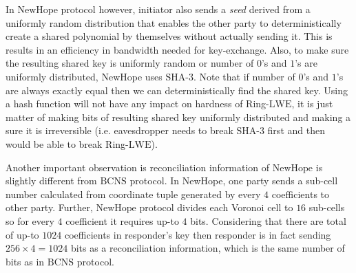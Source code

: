 In $\mathrm{NewHope}$ protocol however, initiator also sends a \textit{seed} derived from a uniformly random distribution that enables the other party to deterministically create a shared polynomial by themselves without actually sending it. This is results in an efficiency in bandwidth needed for key-exchange. Also, to make sure the resulting shared key is uniformly random or number of $0$'s and $1$'s are uniformly distributed, NewHope uses $\mathrm{SHA}$-3. Note that if number of $0$'s and $1$'s are always exactly equal then we can deterministically find the shared key. Using a hash function will not have any impact on hardness of Ring-$\mathrm{LWE}$, it is just matter of making bits of resulting shared key uniformly distributed and making a sure it is irreversible (i.e. eavesdropper needs to break $\mathrm{SHA}$-3 first and then would be able to break Ring-$\mathrm{LWE}$). 

Another important observation is reconciliation information of $\mathrm{NewHope}$ is slightly different from $\mathrm{BCNS}$ protocol. In NewHope, one party sends a sub-cell number calculated from coordinate tuple generated by every $4$ coefficients to other party. Further, $\mathrm{NewHope}$ protocol divides each Voronoi cell to $16$ sub-cells so for every $4$ coefficient it requires up-to $4$ bits. Considering that there are total of up-to $1024$ coefficients in responder's key then responder is in fact sending $256 \times 4 = 1024$ bits as a reconciliation information, which is the same number of bits as in $\mathrm{BCNS}$ protocol.

